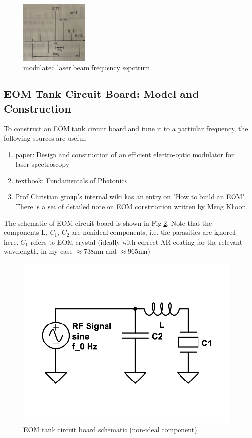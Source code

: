 \documentclass[11pt,A4Paper]{article}
\begin{document}
\begin{figure}[H]
    \centering
    \includegraphics[width=0.3\textwidth]{EOMsidebandTheory.png}
    \caption{modulated laser beam frequency sepctrum}
    \label{fig:EOMsidebandTheory}
\end{figure}

 \subsection{EOM Tank Circuit Board: Model and Construction}
To construct an EOM tank circuit board and tune it to a partiular frequency, the following sources are useful: 
\begin{enumerate}
    \item paper: Design and construction of an efficient electro-optic modulator for laser spectroscopy\cite{20MHzEOM}
    \item textbook: Fundamentals of Photonics\cite{fundamentalsOfPhotonics}
    \item Prof Christian group's internal wiki has an entry on "How to build an EOM". There is a set of detailed note on EOM construction written by Meng Khoon. 
\end{enumerate}
The schematic of EOM circuit board is shown in Fig \ref{fig:eom-tank-cirucuit1}. Note that the components L, $C_1$, $C_2$ are nonideal components, i.e. the parasitics are ignored here.
$C_1$ refers to EOM crystal (ideally with correct AR coating for the relevant wavelength, in my case $\approx$738nm and $\approx$965nm)

\begin{figure}[H]
    \centering
    \includegraphics[width=.5\textwidth]{eom-tank-cirucuit1.png}
    \caption{EOM tank circuit board schematic (non-ideal component)}
    \label{fig:eom-tank-cirucuit1}
\end{figure}
\end{document}
